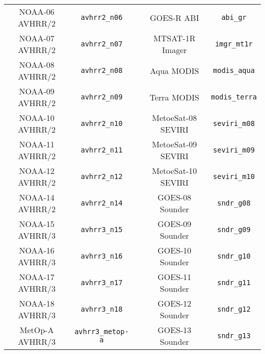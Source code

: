 \begin{table}[htp]
\begin{tabular}{c c c c c}
NOAA-06 AVHRR/2           & \texttt{avhrr2\_n06}     & \hspace{0.2cm} & GOES-R ABI                   & \texttt{abi\_gr}           \\
NOAA-07 AVHRR/2           & \texttt{avhrr2\_n07}     & \hspace{0.2cm} & MTSAT-1R Imager              & \texttt{imgr\_mt1r}        \\
NOAA-08 AVHRR/2           & \texttt{avhrr2\_n08}     & \hspace{0.2cm} & Aqua MODIS                   & \texttt{modis\_aqua}       \\
NOAA-09 AVHRR/2           & \texttt{avhrr2\_n09}     & \hspace{0.2cm} & Terra MODIS                  & \texttt{modis\_terra}      \\
NOAA-10 AVHRR/2           & \texttt{avhrr2\_n10}     & \hspace{0.2cm} & MetoeSat-08 SEVIRI           & \texttt{seviri\_m08}       \\
NOAA-11 AVHRR/2           & \texttt{avhrr2\_n11}     & \hspace{0.2cm} & MetoeSat-09 SEVIRI           & \texttt{seviri\_m09}       \\
NOAA-12 AVHRR/2           & \texttt{avhrr2\_n12}     & \hspace{0.2cm} & MetoeSat-10 SEVIRI           & \texttt{seviri\_m10}       \\
NOAA-14 AVHRR/2           & \texttt{avhrr2\_n14}     & \hspace{0.2cm} & GOES-08 Sounder              & \texttt{sndr\_g08}         \\
NOAA-15 AVHRR/3           & \texttt{avhrr3\_n15}     & \hspace{0.2cm} & GOES-09 Sounder              & \texttt{sndr\_g09}         \\
NOAA-16 AVHRR/3           & \texttt{avhrr3\_n16}     & \hspace{0.2cm} & GOES-10 Sounder              & \texttt{sndr\_g10}         \\
NOAA-17 AVHRR/3           & \texttt{avhrr3\_n17}     & \hspace{0.2cm} & GOES-11 Sounder              & \texttt{sndr\_g11}         \\
NOAA-18 AVHRR/3           & \texttt{avhrr3\_n18}     & \hspace{0.2cm} & GOES-12 Sounder              & \texttt{sndr\_g12}         \\
MetOp-A AVHRR/3           & \texttt{avhrr3\_metop-a} & \hspace{0.2cm} & GOES-13 Sounder              & \texttt{sndr\_g13}         \\

\end{tabular}
\end{table}
